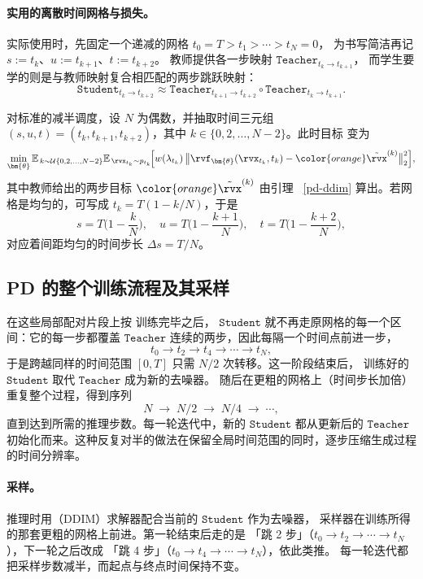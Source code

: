 \paragraph{实用的离散时间网格与损失。}
实际使用时，先固定一个递减的网格 $t_0=T>t_1>\cdots>t_N=0$，
为书写简洁再记 $s:=t_k$、$u:=t_{k+1}$、$t:=t_{k+2}$。
教师提供各一步映射 $\mathtt{Teacher}_{t_k\to t_{k+1}}$，
而学生要学的则是与教师映射复合相匹配的两步跳跃映射：
\[
\mathtt{Student}_{t_k\to t_{k+2}}
 \approx
\mathtt{Teacher}_{t_{k+1}\to t_{k+2}}
\circ
\mathtt{Teacher}_{t_{k}\to t_{k+1}}.
\]

对标准的减半调度，设 $N$ 为偶数，并抽取时间三元组
$(s,u,t)=(t_k,t_{k+1},t_{k+2})$，其中
$k\in\{0,2,\ldots,N-2\}$。此时目标  变为
\[
\min_{\bm{\theta}}
\mathbb{E}_{\,k \sim \mathcal{U}\{0,2,\ldots,N{-}2\}}
\mathbb{E}_{\,\rvx_{t_k}\sim p_{t_k}}\!
\Big[
  w(\lambda_{t_k})\,
  \big\|
  \rvf_{\bm{\theta}}(\rvx_{t_k},t_k) - {\color{orange}\tilde\rvx}^{(k)}
  \big\|_2^2
\Big],
\]
其中教师给出的两步目标 ${\color{orange}\tilde\rvx}^{(k)}$ 由引理
~\ref{pd-ddim} 算出。若网格是均匀的，可写成 $t_k = T(1 - k/N)$，于是
\[
s = T\Big(1 - \frac{k}{N}\Big),\quad
u = T\Big(1 - \frac{k+1}{N}\Big),\quad
t = T\Big(1 - \frac{k+2}{N}\Big),
\]
对应着间距均匀的时间步长 $\Delta s = T/N$。


\subsection{PD 的整个训练流程及其采样}\label{subsec:pd-training}
在这些局部配对片段上按  训练完毕之后，
$\mathtt{Student}$ 就不再走原网格的每一个区间：它的每一步都覆盖
$\mathtt{Teacher}$ 连续的两步，因此每隔一个时间点前进一步，
\[
t_0 \to t_2 \to t_4 \to \cdots \to t_N,
\]
于是跨越同样的时间范围 $[0,T]$ 只需 $N/2$ 次转移。这一阶段结束后，
训练好的 $\mathtt{Student}$ 取代 $\mathtt{Teacher}$ 成为新的去噪器。
随后在更粗的网格上（时间步长加倍）重复整个过程，得到序列
\[
N \;\to\; N/2 \;\to\; N/4 \;\to\; \cdots,
\]
直到达到所需的推理步数。每一轮迭代中，新的 $\mathtt{Student}$
都从更新后的 $\mathtt{Teacher}$ 初始化而来。这种反复对半的做法在保留全局时间范围的同时，逐步压缩生成过程的时间分辨率。

\paragraph{采样。}
推理时用（DDIM）求解器配合当前的 $\mathtt{Student}$ 作为去噪器，
采样器在训练所得的那套更粗的网格上前进。第一轮结束后走的是
「跳 2 步」（$t_0 \to t_2 \to \cdots \to t_N$），下一轮之后改成
「跳 4 步」（$t_0 \to t_4 \to \cdots \to t_N$），依此类推。
每一轮迭代都把采样步数减半，而起点与终点时间保持不变。

